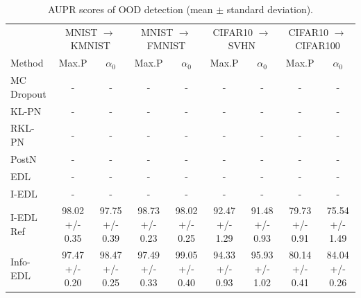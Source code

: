 \begin{table}[t]
\centering
\caption{AUPR scores of OOD detection (mean $\pm$ standard deviation).}
\small
\begin{tabular}{lcccccccc}
\toprule
& \multicolumn{2}{c}{MNIST $\rightarrow$ KMNIST} & \multicolumn{2}{c}{MNIST $\rightarrow$ FMNIST} & \multicolumn{2}{c}{CIFAR10 $\rightarrow$ SVHN} & \multicolumn{2}{c}{CIFAR10 $\rightarrow$ CIFAR100} \\
Method & Max.P & $\alpha_0$ & Max.P & $\alpha_0$ & Max.P & $\alpha_0$ & Max.P & $\alpha_0$ \\
\midrule
MC Dropout & - & - & - & - & - & - & - & - \\
KL-PN & - & - & - & - & - & - & - & - \\
RKL-PN & - & - & - & - & - & - & - & - \\
PostN & - & - & - & - & - & - & - & - \\
EDL & - & - & - & - & - & - & - & - \\
I-EDL & - & - & - & - & - & - & - & - \\
I-EDL Ref & 98.02 +/- 0.35 & 97.75 +/- 0.39 & 98.73 +/- 0.23 & 98.02 +/- 0.25 & 92.47 +/- 1.29 & 91.48 +/- 0.93 & 79.73 +/- 0.91 & 75.54 +/- 1.49 \\
Info-EDL & 97.47 +/- 0.20 & 98.47 +/- 0.25 & 97.49 +/- 0.33 & 99.05 +/- 0.40 & 94.33 +/- 0.93 & 95.93 +/- 1.02 & 80.14 +/- 0.41 & 84.04 +/- 0.26 \\
\bottomrule
\end{tabular}
\end{table}
